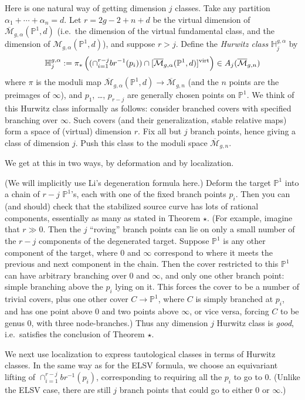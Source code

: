 \documentclass[12pt,letterpaper]{amsart}
\renewcommand{\H}{\mathbb{H}}
\newcommand{\proj}{\mathbb P}
\newcommand{\cm}{{\mathcal{M}}}
\newcommand{\cmbar}{\overline{\cm}}
\newcommand{\al}{\alpha}
\newcommand{\virt}{\rm{virt}}
\begin{document}
{Here is one natural way of getting dimension $j$ classes.  Take any
partition $\al_1 + \cdots + \al_n = d$.  Let $r= 2g-2+n+d$ be the
virtual dimension of $\cmbar_{g,\al}(\proj^1,d)$ (i.e.\ the dimension
of the virtual fundamental class, and the dimension of
$\cm_{g,\al}(\proj^1,d)$), and suppose $r>j$.  Define the {\em Hurwitz
class} $\H^{g, \al}_j$ by 
$$
\H^{g,\al}_j := \pi_* \left( (\cap_{i=1}^{r-j} br^{-1}(p_i)) \cap
  [\cmbar_{g,\al}(\proj^1,d)]^{\virt} \right) \in A_j(\cmbar_{g,n})$$
where $\pi$ is the moduli map $\cmbar_{g,\al}(\proj^1,d) \rightarrow
\cmbar_{g,n}$ (and the $n$ points are the preimages of $\infty$), and
$p_1$, \dots, $p_{r-j}$ are generally chosen points on $\proj^1$.  We
think of this Hurwitz class informally as follows: consider branched
covers with specified branching over $\infty$.  Such covers (and their
generalization, stable relative maps) form a space of (virtual)
dimension $r$.  Fix all but $j$ branch points, hence giving a class of
dimension $j$.  Push this class to the moduli space $\cmbar_{g,n}$.

We get at this in two ways, by deformation and by localization.


(We will implicitly use Li's degeneration formula here.)  Deform the
target $\proj^1$ into a chain of $r-j$ $\proj^1$'s, each with one of
the fixed branch points $p_i$.  Then you can (and should) check that
the stabilized source curve has lots of rational components,
essentially as many as stated in Theorem $\star$.  (For example,
imagine that $r \gg 0$.  Then the $j$ ``roving'' branch points can lie
on only a small number of the $r-j$ components of the degenerated
target.  Suppose $\proj^1$ is any other component of the target, where $0$
and $\infty$ correspond to where it meets the previous and next
component in the chain.  Then the cover restricted to this $\proj^1$
can have arbitrary branching over $0$ and $\infty$, and only one other
branch point: simple branching above the $p_i$ lying on it.  This
forces the cover to be a number of trivial covers, plus one other
cover $C \rightarrow \proj^1$, where $C$ is simply branched at $p_i$,
and has one point above $0$ and two points above $\infty$, or vice
versa, forcing $C$ to be genus $0$, with three node-branches.)  Thus
any dimension $j$ Hurwitz class is {\em good}, i.e.\ satisfies the
conclusion of Theorem $\star$.

  We next use localization to express
tautological classes in terms of Hurwitz classes.  In the same way as
for the ELSV formula, we choose an equivariant lifting of
$\cap_{i=1}^{r-j} br^{-1}(p_i)$, corresponding to requiring all the
$p_i$ to go to $0$.  (Unlike the ELSV case, there are still $j$ branch
points that could go to either $0$ or $\infty$.)

}
\end{document}

